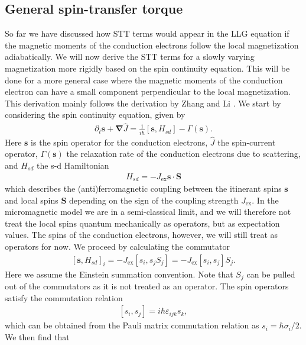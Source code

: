 \subsection{General spin-transfer torque} \label{sec:GeneralSTT}
So far we have discussed how STT terms would appear in the LLG equation if the magnetic moments of the conduction electrons follow the local magnetization adiabatically. We will now derive the STT terms for a slowly varying magnetization more rigidly based on the spin continuity equation. This will be done for a more general case where the magnetic moments of the conduction electron can have a small component perpendicular to the local magnetization. This derivation mainly follows the derivation by Zhang and Li \cite{ZhangLi-04}. We start by considering the spin continuity equation, given by
\begin{align}
\partial_t\mathbold{s} + \mathbold{\nabla}\hat{J} = \frac{1}{i\hbar} \left[\mathbold{s}, H_{sd}\right] - \Gamma(\mathbold{s}).
\end{align}
Here $\mathbold{s}$ is the spin operator for the conduction electrons, $\hat{J}$ the spin-current operator, $\Gamma(\mathbold{s})$ the relaxation rate of the conduction electrons due to scattering, and $H_{sd}$ the s-d Hamiltonian
\begin{align}
H_{sd} = -J_{\textrm{ex}}\mathbold{s}\cdot\mathbold{S}
\end{align}
which describes the (anti)ferromagnetic coupling between the itinerant spins $\mathbold{s}$ and local spins $\mathbold{S}$ depending on the sign of the coupling strength $J_{\textrm{ex}}$. In the micromagnetic model we are in a semi-classical limit, and we will therefore not treat the local spins quantum mechanically as operators, but as expectation values. The spins of the conduction electrons, however, we will still treat as operators for now. We proceed by calculating the commutator
\begin{align}
\left[\mathbold{s}, H_{sd}\right]_i = -J_{\textrm{ex}} \left[s_i, s_j S_j\right] = -J_{\textrm{ex}}\left[s_i, s_j\right] S_j.
\end{align}
Here we assume the Einstein summation convention. Note that $S_j$ can be pulled out of the commutators as it is not treated as an operator. The spin operators satisfy the commutation relation
\begin{align}
\left[s_i, s_j\right] = i\hbar\varepsilon_{ijk}s_k,
\end{align}
which can be obtained from the Pauli matrix commutation relation as $s_i = \hbar \sigma_i/2$. We then find that
